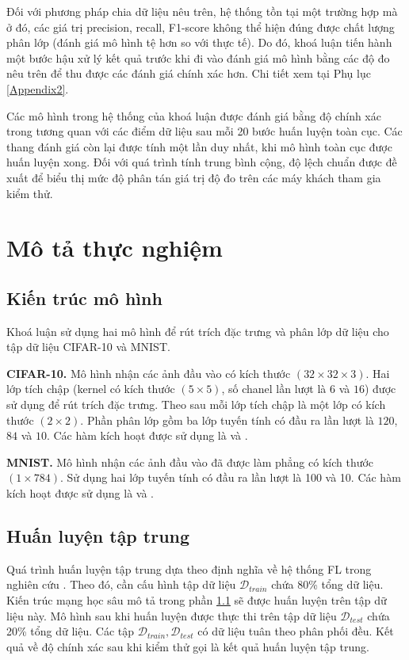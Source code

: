 Đối với phương pháp chia dữ liệu nêu trên, hệ thống tồn tại một trường hợp mà ở đó, các giá trị precision, recall, F1-score không thể hiện đúng được chất lượng phân lớp (đánh giá mô hình tệ hơn so với thực tế). Do đó, khoá luận tiến hành một bước hậu xử lý kết quả trước khi đi vào đánh giá mô hình bằng các độ đo nêu trên để thu được các đánh giá chính xác hơn. Chi tiết xem tại Phụ lục \ref{Appendix2}.

Các mô hình trong hệ thống của khoá luận được đánh giá bằng độ chính xác trong tương quan với các điểm dữ liệu sau mỗi 20 bước huấn luyện toàn cục. Các thang đánh giá còn lại được tính một lần duy nhất, khi mô hình toàn cục được huấn luyện xong. Đối với quá trình tính trung bình cộng, độ lệch chuẩn được đề xuất để biểu thị mức độ phân tán giá trị độ đo trên các máy khách tham gia kiểm thử.

\section{Mô tả thực nghiệm}

\subsection{Kiến trúc mô hình}
\label{model_schema}

Khoá luận sử dụng hai mô hình để rút trích đặc trưng và phân lớp dữ liệu cho tập dữ liệu CIFAR-10 và MNIST.

\textbf{CIFAR-10.} Mô hình nhận các ảnh đầu vào có kích thước $(32\times32\times3)$. Hai lớp tích chập (kernel có kích thước $(5\times5)$, số chanel lần lượt là $6$ và $16$) được sử dụng để rút trích đặc trưng. Theo sau mỗi lớp tích chập là một lớp  có kích thước $(2\times2)$. Phần phân lớp gồm ba lớp tuyến tính có đầu ra lần lượt là $120$, $84$ và $10$. Các hàm kích hoạt được sử dụng là  và .

\textbf{MNIST.} Mô hình nhận các ảnh đầu vào đã được làm phẳng có kích thước $(1\times784)$. Sử dụng hai lớp tuyến tính có đầu ra lần lượt là 100 và 10. Các hàm kích hoạt được sử dụng là  và .

\subsection{Huấn luyện tập trung}

Quá trình huấn luyện tập trung dựa theo định nghĩa về hệ thống FL trong nghiên cứu \cite{yin2021comprehensive}. Theo đó, cần cấu hình tập dữ liệu $\mathcal{D}_{train}$ chứa 80\% tổng dữ liệu. Kiến trúc mạng học sâu mô tả trong phần \ref{model_schema} sẽ được huấn luyện trên tập dữ liệu này. Mô hình sau khi huấn luyện được thực thi trên tập dữ liệu $\mathcal{D}_{test}$ chứa 20\% tổng dữ liệu. Các tập $\mathcal{D}_{train}, \mathcal{D}_{test}$ có dữ liệu tuân theo phân phối đều. Kết quả về độ chính xác sau khi kiểm thử gọi là kết quả huấn luyện tập trung.


